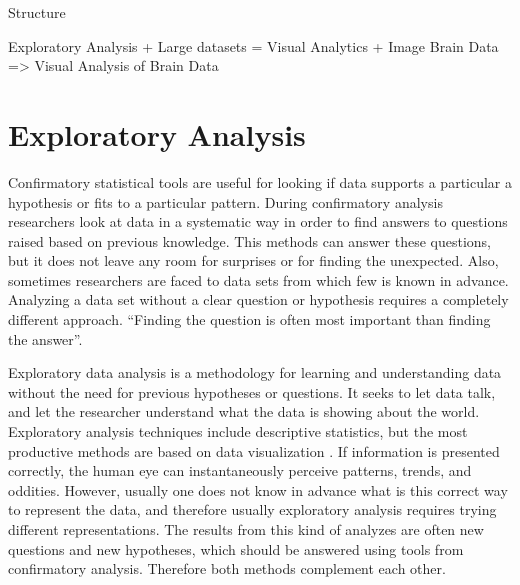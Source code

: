 
Structure

Exploratory Analysis + Large datasets  = Visual Analytics
+ Image Brain Data => Visual Analysis of Brain Data

\section{Exploratory Analysis}

%


Confirmatory statistical tools are useful for looking if data supports a particular a hypothesis or fits to a particular pattern.  During confirmatory analysis researchers look at data in a systematic way in order to find answers to questions raised based on previous knowledge. This methods can answer these questions, but it does not leave any room for surprises or for finding the unexpected. Also, sometimes researchers are faced to data sets from which few is known in advance. Analyzing a data set without a clear question or hypothesis requires a completely different approach. ``Finding the question is often most important than finding the answer''\autocite{tukey_we_1980}.

Exploratory data analysis is a methodology for learning and understanding data without the need for previous hypotheses or questions. It seeks to let data talk, and let the researcher understand what the data is showing about the world. Exploratory analysis techniques include descriptive statistics, but the most productive methods are based on data visualization \autocite{tukey_exploratory_1977}. If information is presented correctly, the human eye can instantaneously perceive patterns, trends, and oddities. However, usually one does not know in advance what is this correct way to represent the data, and therefore usually exploratory analysis requires trying different representations. The results from this kind of analyzes are often new questions and new hypotheses, which should be answered using tools from confirmatory analysis. Therefore both methods complement each other.

